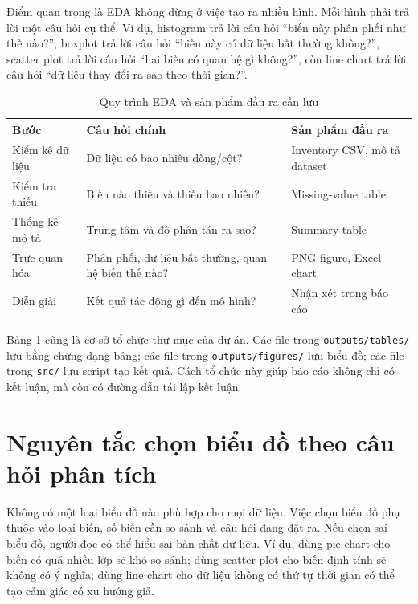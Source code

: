 Điểm quan trọng là EDA không dừng ở việc tạo ra nhiều hình. Mỗi hình phải trả lời một câu hỏi cụ thể. Ví dụ, histogram trả lời câu hỏi ``biến này phân phối như thế nào?'', boxplot trả lời câu hỏi ``biến này có dữ liệu bất thường không?'', scatter plot trả lời câu hỏi ``hai biến có quan hệ gì không?'', còn line chart trả lời câu hỏi ``dữ liệu thay đổi ra sao theo thời gian?''.

\begin{table}[H]
\centering
\caption{Quy trình EDA và sản phẩm đầu ra cần lưu}
\label{tab:chapter1_eda_outputs}
\small
\begin{tabular}{p{}p{}p{}}
\toprule
Bước & Câu hỏi chính & Sản phẩm đầu ra \\
\midrule
Kiểm kê dữ liệu & Dữ liệu có bao nhiêu dòng/cột? & Inventory CSV, mô tả dataset \\
Kiểm tra thiếu & Biến nào thiếu và thiếu bao nhiêu? & Missing-value table \\
Thống kê mô tả & Trung tâm và độ phân tán ra sao? & Summary table \\
Trực quan hóa & Phân phối, dữ liệu bất thường, quan hệ biến thế nào? & PNG figure, Excel chart \\
Diễn giải & Kết quả tác động gì đến mô hình? & Nhận xét trong báo cáo \\
\bottomrule
\end{tabular}
\end{table}

Bảng \ref{tab:chapter1_eda_outputs} cũng là cơ sở tổ chức thư mục của dự án. Các file trong \texttt{outputs/tables/} lưu bằng chứng dạng bảng; các file trong \texttt{outputs/figures/} lưu biểu đồ; các file trong \texttt{src/} lưu script tạo kết quả. Cách tổ chức này giúp báo cáo không chỉ có kết luận, mà còn có đường dẫn tái lập kết luận.

\section{Nguyên tắc chọn biểu đồ theo câu hỏi phân tích}

Không có một loại biểu đồ nào phù hợp cho mọi dữ liệu. Việc chọn biểu đồ phụ thuộc vào loại biến, số biến cần so sánh và câu hỏi đang đặt ra. Nếu chọn sai biểu đồ, người đọc có thể hiểu sai bản chất dữ liệu. Ví dụ, dùng pie chart cho biến có quá nhiều lớp sẽ khó so sánh; dùng scatter plot cho biến định tính sẽ không có ý nghĩa; dùng line chart cho dữ liệu không có thứ tự thời gian có thể tạo cảm giác có xu hướng giả.

